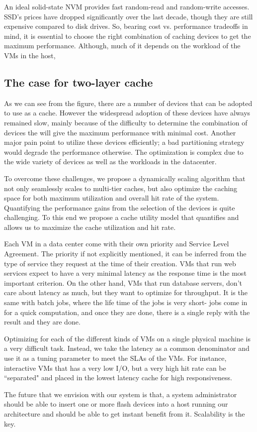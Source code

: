 An ideal solid-state NVM provides fast random-read and random-write accesses. SSD's prices have dropped significantly over the last decade, though they are still expensive compared to disk drives. So, bearing cost vs. performance tradeoffs in mind, it is essential to choose the right combination of caching devices to get the maximum performance. Although, much of it depends on the workload of the VMs in the host, 



\subsection{The case for two-layer cache}

As we can see from the figure, there are a number of devices that can be adopted to use as a cache. However the widespread adoption of these devices have always remained slow, mainly because of the difficulty to determine the combination of devices the will give the maximum performance with minimal cost. Another major pain point to utilize these devices efficiently; a bad partitioning strategy would degrade the performance otherwise. The optimization is complex due to the wide variety of devices as well as the workloads in the datacenter.

To overcome these challenges, we propose a dynamically scaling algorithm that not only seamlessly scales to multi-tier caches, but also optimize the caching space for both maximum utilization and overall hit rate of the system. Quantifying the performance gains from the selection of the devices is quite challenging. To this end we propose a cache utility model that quantifies and allows us to maximize the cache utilization and hit rate.

Each VM in a data center come with their own priority and Service Level Agreement. The priority if not explicitly mentioned, it can be inferred from the type of service they request at the time of their creation. VMs that run web services expect to have a very minimal latency as the response time is the most important criterion. On the other hand, VMs that run database servers, don't care about latency as much, but they want to optimize for throughput. It is the same with batch jobs, where the life time of the jobs is very short- jobs come in for a quick computation, and once they are done, there is a single reply with the result and they are done.

Optimizing for each of the different kinds of VMs on a single physical machine is a very difficult task. Instead, we take the latency as a common denominator and use it as a tuning parameter to meet the SLAs of the VMs. For instance, interactive VMs that has a very low I/O, but a very high hit rate can be ``separated" and placed in the lowest latency cache for high responsiveness.

The future that we envision with our system is that, a system administrator should be able to insert one or more flash devices into a host running our architecture and should be able to get instant benefit from it. Scalability is the key.
